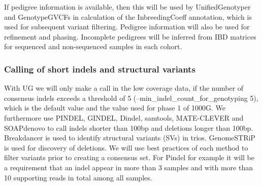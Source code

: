 If pedigree information is available, then this will be used by UnifiedGenotyper and GenotypeGVCFs in calculation of the InbreedingCoeff annotation, which is used for subsequent variant filtering. Pedigree information will also be used for refinement and phasing. Incomplete pedigrees will be inferred from IBD matrices for sequenced and non-sequenced samples in each cohort.

\subsubsection{Calling of short indels and structural variants}
With UG we will only make a call in the low coverage data, if the number of consensus indels exceeds a threshold of 5 (--min\_indel\_count\_for\_genotyping 5), which is the default value and the value used for phase 1 of 1000G.
We furthermore use PINDEL, GINDEL, Dindel, samtools, MATE-CLEVER and SOAPdenovo to call indels shorter than 100bp and deletions longer than 100bp. Breakdancer is used to identify structural variants (SVs) in trios. GenomeSTRiP is used for discovery of deletions. We will use best practices of each method to filter variants prior to creating a consensus set. For Pindel for example it will be a requirement that an indel appear in more than 3 samples and with more than 10 supporting reads in total among all samples.

